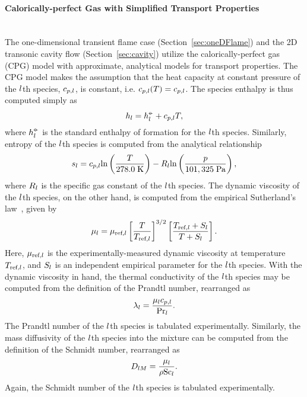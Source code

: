 \paragraph*{Calorically-perfect Gas with Simplified Transport Properties}\mbox{}\\

The one-dimensional transient flame case (Section~\ref{sec:oneDFlame}) and the 2D transonic cavity flow (Section~\ref{sec:cavity}) utilize the calorically-perfect gas (CPG) model with approximate, analytical models for transport properties. The CPG model makes the assumption that the heat capacity at constant pressure of the $l$th species, $c_{p,l}$, is constant, i.e. $c_{p,l}(T) = c_{p,l}$. The species enthalpy is thus computed simply as
%
\begin{equation}\label{eq:cpgEnthSpec}
	h_{l} = h^{\circ\kern-0.47em-}_{l} + c_{p,l} T,
\end{equation}
%
where $h^{\circ\kern-0.47em-}_{l}$ is the standard enthalpy of formation for the $l$th species. Similarly, entropy of the $l$th species is computed from the analytical relationship
%
\begin{equation}\label{eq:cpgEntropySpec}
	s_{l} = c_{p,l} \text{ln}\left(\frac{T}{278.0 \; \text{K}}\right) - R_{l} \text{ln}\left(\frac{p}{101,325 \; \text{Pa}}\right),
\end{equation}
%
where $R_{l}$ is the specific gas constant of the $l$th species. The dynamic viscosity of the $l$th species, on the other hand, is computed from the empirical Sutherland's law~\cite{Sutherland1893}, given by
%
\begin{equation}\label{eq:viscSuthSpec}
	\mu_{l} = \mu_{\text{ref},l} \left[ \frac{T}{T_{\text{ref},l}} \right]^{3/2} \left[ \frac{T_{\text{ref},l} + S_{l}}{T + S_{l}} \right].
\end{equation}
%
Here, $\mu_{\text{ref},l}$ is the experimentally-measured dynamic viscosity at temperature $T_{\text{ref},l}$, and $S_{l}$ is an independent empirical parameter for the $l$th species. With the dynamic viscosity in hand, the thermal conductivity of the $l$th species may be computed from the definition of the Prandtl number, rearranged as
%
\begin{equation}\label{eq:cpgThermCondSpec}
	\lambda_{l} = \frac{\mu_{l} c_{p,l}}{\text{Pr}_{l}}.
\end{equation}
%
The Prandtl number of the $l$th species is tabulated experimentally. Similarly, the mass diffusivity of the $l$th species into the mixture can be computed from the definition of the Schmidt number, rearranged as
%
\begin{equation}\label{eq:cpgMassDiffSpec}
	D_{l M} = \frac{\mu_{l}}{\rho \text{Sc}_{l}}.
\end{equation}
%
Again, the Schmidt number of the $l$th species is tabulated experimentally.

